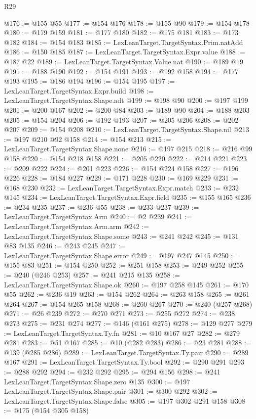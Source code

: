 \begin{lexlean}{R29}
\begin{coremodule}
@176 := @155 @55
@177 := @154 @176
@178 := @155 @90
@179 := @154 @178
@180 := @179 @159
@181 := @177 @180
@182 := @175 @181
@183 := @173 @182
@184 := @154 @183
@185 := LexLeanTarget.TargetSyntax.Prim.natAdd
@186 := @150 @185
@187 := LexLeanTarget.TargetSyntax.Expr.value
@188 := @187 @22
@189 := LexLeanTarget.TargetSyntax.Value.nat
@190 := @189 @19
@191 := @188 @190
@192 := @154 @191
@193 := @192 @158
@194 := @177 @193
@195 := @186 @194
@196 := @154 @195
@197 := LexLeanTarget.TargetSyntax.Expr.build
@198 := LexLeanTarget.TargetSyntax.Shape.adt
@199 := @198 @90
@200 := @197 @199
@201 := @200 @167
@202 := @200 @84
@203 := @189 @90
@204 := @188 @203
@205 := @154 @204
@206 := @192 @193
@207 := @205 @206
@208 := @202 @207
@209 := @154 @208
@210 := LexLeanTarget.TargetSyntax.Shape.nil
@213 := @197 @210 @92 @158
@214 := @154 @213
@215 := LexLeanTarget.TargetSyntax.Shape.none
@216 := @197 @215
@218 := @216 @99 @158
@220 := @154 @218 @158
@221 := @205 @220
@222 := @214 @221
@223 := @209 @222
@224 := @201 @223
@226 := @154 @224 @158
@227 := @196 @226
@228 := @184 @227
@229 := @171 @228
@230 := @169 @229
@231 := @168 @230
@232 := LexLeanTarget.TargetSyntax.Expr.match
@233 := @232 @145
@234 := LexLeanTarget.TargetSyntax.Expr.field
@235 := @155 @165
@236 := @234 @235
@237 := @236 @55
@238 := @233 @237
@239 := LexLeanTarget.TargetSyntax.Arm
@240 := @2 @239
@241 := LexLeanTarget.TargetSyntax.Arm.arm
@242 := LexLeanTarget.TargetSyntax.Shape.some
@243 := @241 @242
@245 := @131 @83 @135
@246 := @243 @245
@247 := LexLeanTarget.TargetSyntax.Shape.error
@249 := @197 @247 @145
@250 := @155 @83
@251 := @154 @250
@252 := @251 @158
@253 := @249 @252
@255 := @240 (@246 @253)
@257 := @241 @215 @135
@258 := LexLeanTarget.TargetSyntax.Shape.ok
@260 := @197 @258 @145
@261 := @170 @55
@262 := @236 @19
@263 := @154 @262
@264 := @263 @158
@265 := @261 @264
@267 := @154 @265 @158
@268 := @260 @267
@270 := @240 (@257 @268)
@271 := @26 @239
@272 := @270 @271
@273 := @255 @272
@274 := @238 @273
@275 := @231 @274
@277 := @146 (@161 @275)
@278 := @129 @277
@279 := LexLeanTarget.TargetSyntax.Ty.fn
@281 := @10 @167 @27
@282 := @279 @281
@283 := @51 @167
@285 := @10 (@282 @283)
@286 := @23 @281
@288 := @139 (@285 @286)
@289 := LexLeanTarget.TargetSyntax.Ty.pair
@290 := @289 @167
@291 := LexLeanTarget.TargetSyntax.Ty.bool
@292 := @290 @291
@293 := @288 @292
@294 := @232 @292
@295 := @294 @156
@298 := @241 LexLeanTarget.TargetSyntax.Shape.zero @135
@300 := @197 LexLeanTarget.TargetSyntax.Shape.pair
@301 := @300 @292
@302 := LexLeanTarget.TargetSyntax.Shape.false
@305 := @197 @302 @291 @158
@308 := @175 (@154 @305 @158)

\end{coremodule}
\end{lexlean}
